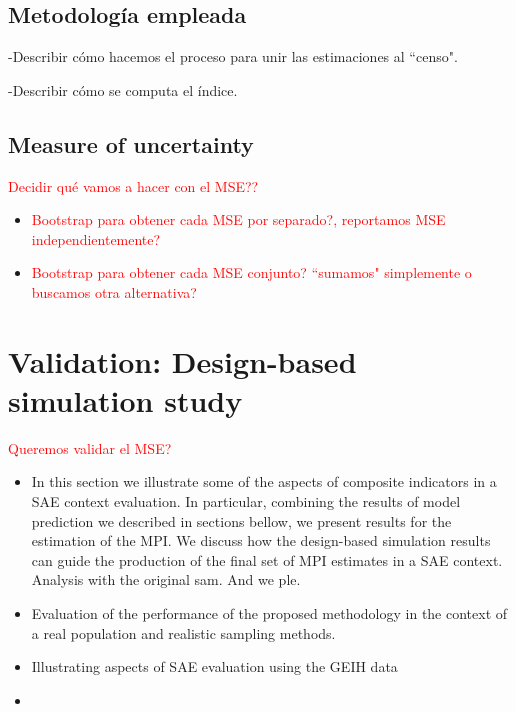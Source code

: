 \documentclass[a4paper, 11pt]{article}
\begin{document}
\subsection{Metodología empleada}

-Describir cómo hacemos el proceso para unir las estimaciones al ``censo". 

-Describir cómo se computa el índice. 




\subsection{Measure of uncertainty}

\textcolor{red} {Decidir qué vamos a hacer con el MSE??}
\begin{itemize}
    \item \textcolor{red} {Bootstrap para obtener cada MSE por separado?, reportamos MSE independientemente?}
    \item \textcolor{red} {Bootstrap para obtener cada MSE conjunto? ``sumamos" simplemente o buscamos otra alternativa? }
\end{itemize}



\section{Validation: Design-based simulation study}

\textcolor{red} {Queremos validar el MSE?}
\


\begin{itemize}
    \item In this section we illustrate some of the aspects of composite indicators in a SAE context evaluation. In particular, combining the results of model prediction we described
in sections bellow, we present results for the estimation of the MPI. We discuss how the design-based simulation results can guide the production of the
final set of MPI estimates in a SAE context.
Analysis with the original sam. And we ple. %
\item Evaluation of the performance of the proposed methodology in the context of a real population and realistic sampling methods.  
    \item Illustrating aspects of SAE evaluation using the GEIH data %
\item
\end{itemize}
\end{document}
